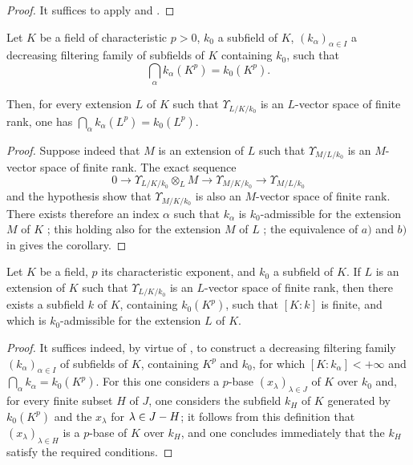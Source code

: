 \begin{proof}
It suffices to apply  and .
\end{proof}

\begin{corollary}[21.8.5]
\label{0.21.8.5}
Let $K$ be a field of characteristic $p>0$, $k_0$ a subfield of $K$, $(k_\alpha)_{\alpha\in I}$ a decreasing filtering family of subfields of $K$ containing $k_0$, such that
\[
  \bigcap_\alpha k_\alpha(K^p)=k_0(K^p).
\]

Then, for every extension $L$ of $K$ such that $\Upsilon_{L/K/k_0}$ is an $L$-vector space of finite rank, one has $\bigcap_\alpha k_\alpha(L^p)=k_0(L^p)$.
\end{corollary}

\begin{proof}
Suppose indeed that $M$ is an extension of $L$ such that $\Upsilon_{M/L/k_0}$ is an $M$-vector space of finite rank.
The exact sequence 
\[
  0\to\Upsilon_{L/K/k_0}\otimes_L M\to\Upsilon_{M/K/k_0}\to\Upsilon_{M/L/k_0}
\]
and the hypothesis show that $\Upsilon_{M/K/k_0}$ is also an $M$-vector space of finite rank.
There exists therefore an index $\alpha$ such that $k_\alpha$ is $k_0$-admissible for the extension $M$ of $K$ ; this holding also for the extension $M$ of $L$ ; the equivalence of $a)$ and $b)$ in  gives the corollary.
\end{proof}

\begin{corollary}[21.8.6]
\label{0.21.8.6}
Let $K$ be a field, $p$ its characteristic exponent, and $k_0$ a subfield of $K$.
If $L$ is an extension of $K$ such that $\Upsilon_{L/K/k_0}$ is an $L$-vector space of finite rank, then there exists a subfield $k$ of $K$, containing $k_0(K^p)$, such that $[K:k]$ is finite, and which is $k_0$-admissible for the extension $L$ of $K$.
\end{corollary}

\begin{proof}
It suffices indeed, by virtue of , to construct a decreasing filtering family $(k_\alpha)_{\alpha\in I}$ of subfields of $K$, containing $K^p$ and $k_0$, for which $[K:k_\alpha]<+\infty$ and $\bigcap_\alpha k_\alpha=k_0(K^p)$.
For this one considers a $p$-base $(x_\lambda)_{\lambda\in J}$ of $K$ over $k_0$ and, for every finite subset $H$ of $J$, one considers the subfield $k_H$ of $K$ generated by $k_0(K^p)$ and the $x_\lambda$ for $\lambda\in J- H$; it follows from this definition that $(x_\lambda)_{\lambda\in H}$ is a $p$-base of $K$ over $k_H$, and one concludes immediately that the $k_H$ satisfy the required conditions.
\end{proof}

